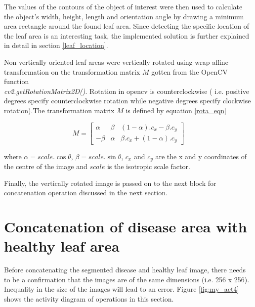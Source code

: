 The values of the contours of the object of interest were then used to calculate the object’s width, height, length and orientation angle by drawing a minimum area rectangle around the found leaf area. Since detecting the specific location of the leaf area is an interesting task, the implemented solution is further explained in detail in section \ref{leaf_location}.

Non vertically oriented leaf areas were vertically rotated using wrap affine transformation on the transformation matrix $M$ gotten from the OpenCV function\\ \textit{cv2.getRotationMatrix2D()}. Rotation in opencv is counterclockwise ( i.e. positive degrees specify counterclockwise rotation while negative degrees specify clockwise rotation).The transformation matrix $M$ is defined by equation \ref{rota_eqn}


\begin{equation} \label{rota_eqn}
M = 
\begin{bmatrix}
\alpha & \beta & (1-\alpha).c_x -\beta.c_y\\
-\beta & \alpha & \beta.c_x+(1-\alpha).c_y
\end{bmatrix}
\end{equation}

where $ \alpha = scale.\cos{\theta}$, $\beta = scale.\sin{\theta}$, $c_x$  and $c_y$ are the x and y coordinates of the centre of the image and $scale$ is the isotropic scale factor. 

Finally, the vertically rotated image is passed on to the next block for concatenation operation discussed in the next section.


\section{Concatenation of disease area with healthy leaf area}
Before concatenating the segmented disease and healthy leaf image, there needs to be a confirmation that the images are of the same dimensions (i.e. 256 x 256). Inequality in the size of the images will lead to an error. Figure \ref{fig:my_act4} shows the activity diagram of operations in this section.

